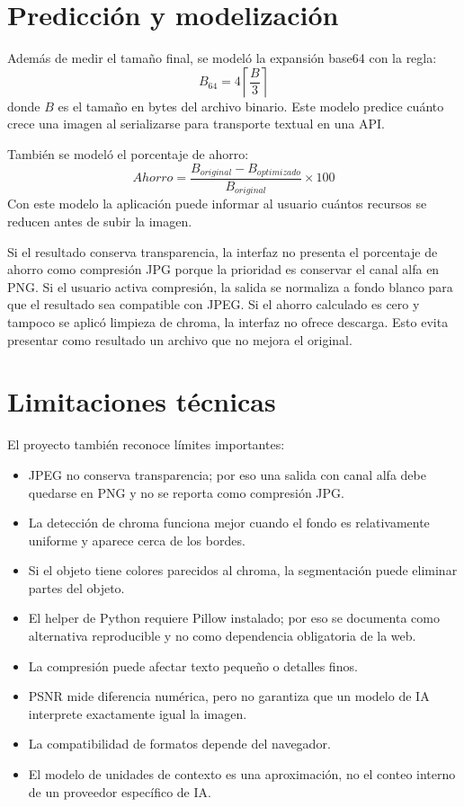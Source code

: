 \documentclass[12pt,letterpaper]{article}
\begin{document}
\section{Predicción y modelización}
Además de medir el tamaño final, se modeló la expansión base64 con la regla:
\[
B_{64} = 4\left\lceil\frac{B}{3}\right\rceil
\]
donde \(B\) es el tamaño en bytes del archivo binario. Este modelo predice cuánto crece una imagen al serializarse para transporte textual en una API.

También se modeló el porcentaje de ahorro:
\[
Ahorro = \frac{B_{original} - B_{optimizado}}{B_{original}}\times100
\]
Con este modelo la aplicación puede informar al usuario cuántos recursos se reducen antes de subir la imagen.

Si el resultado conserva transparencia, la interfaz no presenta el porcentaje de ahorro como compresión JPG porque la prioridad es conservar el canal alfa en PNG. Si el usuario activa compresión, la salida se normaliza a fondo blanco para que el resultado sea compatible con JPEG. Si el ahorro calculado es cero y tampoco se aplicó limpieza de chroma, la interfaz no ofrece descarga. Esto evita presentar como resultado un archivo que no mejora el original.

\section{Limitaciones técnicas}
El proyecto también reconoce límites importantes:
\begin{itemize}
  \item JPEG no conserva transparencia; por eso una salida con canal alfa debe quedarse en PNG y no se reporta como compresión JPG.
  \item La detección de chroma funciona mejor cuando el fondo es relativamente uniforme y aparece cerca de los bordes.
  \item Si el objeto tiene colores parecidos al chroma, la segmentación puede eliminar partes del objeto.
  \item El helper de Python requiere Pillow instalado; por eso se documenta como alternativa reproducible y no como dependencia obligatoria de la web.
  \item La compresión puede afectar texto pequeño o detalles finos.
  \item PSNR mide diferencia numérica, pero no garantiza que un modelo de IA interprete exactamente igual la imagen.
  \item La compatibilidad de formatos depende del navegador.
  \item El modelo de unidades de contexto es una aproximación, no el conteo interno de un proveedor específico de IA.
\end{itemize}
\end{document}
